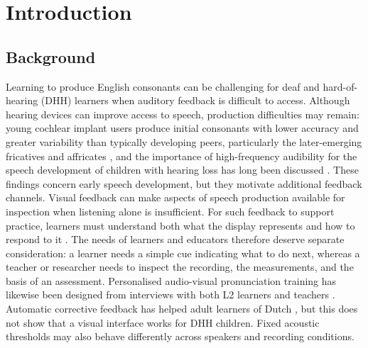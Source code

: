 \documentclass[engproc,article,submit,moreauthors]{Definitions/mdpi}
\begin{document}
\nolinenumbers %

\section{Introduction}
\subsection{Background}
Learning to produce English consonants can be challenging for deaf and hard-of-hearing (DHH) learners when auditory feedback is difficult to access. Although hearing devices can improve access to speech, production difficulties may remain: young cochlear implant users produce initial consonants with lower accuracy and greater variability than typically developing peers, particularly the later-emerging fricatives and affricates \cite{ertmer2011}, and the importance of high-frequency audibility for the speech development of children with hearing loss has long been discussed \cite{stelmachowicz2004}. These findings concern early speech development, but they motivate additional feedback channels. Visual feedback can make aspects of speech production available for inspection when listening alone is insufficient. For such feedback to support practice, learners must understand both what the display represents and how to respond to it \cite{hitchcock2023}. The needs of learners and educators therefore deserve separate consideration: a learner needs a simple cue indicating what to do next, whereas a teacher or researcher needs to inspect the recording, the measurements, and the basis of an assessment. Personalised audio-visual pronunciation training has likewise been designed from interviews with both L2 learners and teachers \cite{bu2021}. Automatic corrective feedback has helped adult learners of Dutch \cite{neri2006}, but this does not show that a visual interface works for DHH children. Fixed acoustic thresholds may also behave differently across speakers and recording conditions.
\end{document}
